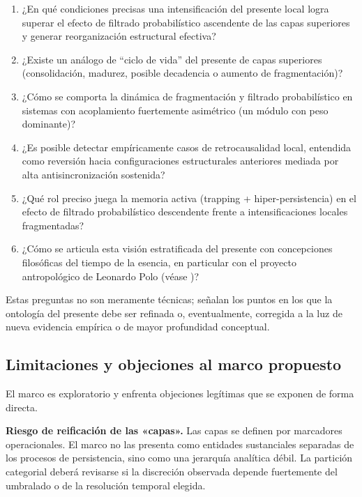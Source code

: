 \begin{enumerate}
    \item ¿En qué condiciones precisas una intensificación del presente local logra superar el efecto de filtrado probabilístico ascendente de las capas superiores y generar reorganización estructural efectiva?
    
    \item ¿Existe un análogo de ``ciclo de vida'' del presente de capas superiores (consolidación, madurez, posible decadencia o aumento de fragmentación)?
    
    \item ¿Cómo se comporta la dinámica de fragmentación y filtrado probabilístico en sistemas con acoplamiento fuertemente asimétrico (un módulo con peso dominante)?
    
    \item ¿Es posible detectar empíricamente casos de retrocausalidad local, entendida como reversión hacia configuraciones estructurales anteriores mediada por alta antisincronización sostenida?
    
    \item ¿Qué rol preciso juega la memoria activa (trapping + hiper-persistencia) en el efecto de filtrado probabilístico descendente frente a intensificaciones locales fragmentadas?
    
    \item ¿Cómo se articula esta visión estratificada del presente con concepciones filosóficas del tiempo de la esencia, en particular con el proyecto antropológico de Leonardo Polo (véase \citep{polo_antropologia_trascendental,padilla_polo_dialogue_2026})?
\end{enumerate}

Estas preguntas no son meramente técnicas; señalan los puntos en los que la ontología del presente debe ser refinada o, eventualmente, corregida a la luz de nueva evidencia empírica o de mayor profundidad conceptual.

\subsection{Limitaciones y objeciones al marco propuesto}

El marco es exploratorio y enfrenta objeciones legítimas que se exponen de forma directa.

\textbf{Riesgo de reificación de las «capas».} Las capas se definen por marcadores operacionales. El marco no las presenta como entidades sustanciales separadas de los procesos de persistencia, sino como una jerarquía analítica débil. La partición categorial deberá revisarse si la discreción observada depende fuertemente del umbralado o de la resolución temporal elegida.

